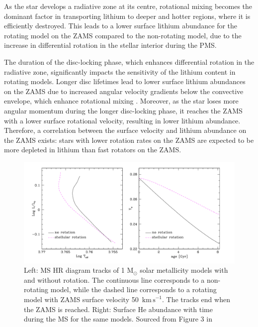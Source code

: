 As the star develops a radiative zone at its centre, rotational mixing becomes the dominant factor in transporting lithium to deeper and hotter regions, where it is efficiently destroyed. 
This leads to a lower surface lithium abundance for the rotating model on the ZAMS compared to the non-rotating model, due to the increase in differential rotation in the stellar interior during the PMS.

The duration of the disc-locking phase, which enhances differential rotation in the radiative zone, significantly impacts the sensitivity of the lithium content in rotating models. 
Longer disc lifetimes lead to lower surface lithium abundances on the ZAMS due to increased angular velocity gradients below the convective envelope, which enhance rotational mixing \citep{eggenberger_angular_2012}.
Moreover, as the star loses more angular momentum during the longer disc-locking phase, it reaches the ZAMS with a lower surface rotational velocity, resulting in lower lithium abundance.
Therefore, a correlation between the surface velocity and lithium abundance on the ZAMS exists: stars with lower rotation rates on the ZAMS are expected to be more depleted in lithium than fast rotators on the ZAMS.

\begin{figure}[h]
    \includegraphics[width=\textwidth]{Figures/intro_figures/MS_effect.png}
    \caption[Effect of rotation of main-sequence evoltuon of a stars 1 $M_{\odot}$.]{Left: MS HR diagram tracks of 1 M$_{\odot}$ solar metallicity models with and without rotation. The continuous line corresponds to a non-rotating model, while the dashed line corresponds to a rotating model with ZAMS surface velocity 50 $\,\mathrm{km\,s}^{-1}$. The tracks end when the ZAMS is reached. Right: Surface He abundance with time during the MS for the same models. Sourced from Figure 3 in \citet{eggenberger_rotation_2013}}
    \label{fig:ms_effect}
\end{figure}

